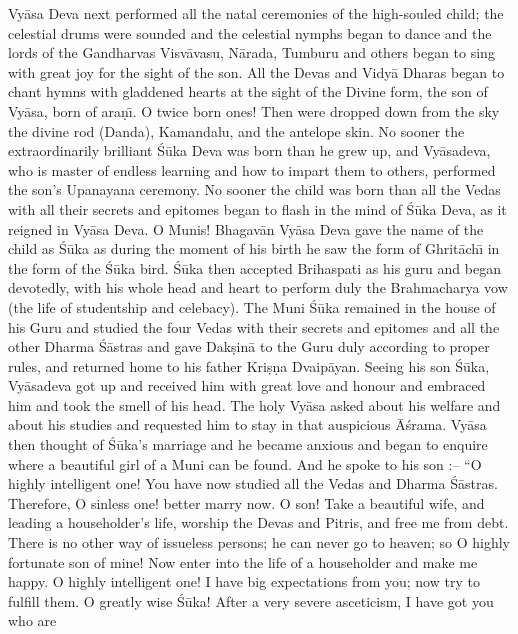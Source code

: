 Vy\=asa Deva next performed all the natal ceremonies of the high-souled child; the celestial drums were sounded and the celestial nymphs began to dance and the lords of the Gandharvas Visv\=avasu, N\=arada, Tumburu and others began to sing with great joy for the sight of the son. All the Devas and Vidy\=a Dharas began to chant hymns with gladdened hearts at the sight of the Divine form, the son of Vy\=asa, born of ara\d{n}\={\i}. O twice born ones! Then were dropped down from the sky the divine rod (Danda), Kamandalu, and the antelope skin. No sooner the extraordinarily brilliant \'S\=uka Deva was born than he grew up, and Vy\=asadeva, who is master of endless learning and how to impart them to others, performed the son's Upanayana ceremony. No sooner the child was born than all the Vedas with all their secrets and epitomes began to flash in the mind of \'S\=uka Deva, as it reigned in Vy\=asa Deva. O Munis! Bhagav\=an Vy\=asa Deva gave the name of the child as \'S\=uka as during the moment of his birth he saw the form of Ghrit\=ach\={\i} in the form of the \'S\=uka bird. \'S\=uka then accepted Brihaspati as his guru and began devotedly, with his whole head and heart to perform duly the Brahmacharya vow (the life of studentship and celebacy). The Muni \'S\=uka remained in the house of his Guru and studied the four Vedas with their secrets and epitomes and all the other Dharma \'S\=astras and gave Dak\d{s}in\=a to the Guru duly according to proper rules, and returned home to his father Kri\d{s}\d{n}a Dvaip\=ayan. Seeing his son \'S\=uka, Vy\=asadeva got up and received him with great love and honour and embraced him and took the smell of his head. The holy Vy\=asa asked about his welfare and about his studies and requested him to stay in that auspicious \=A\'srama. Vy\=asa then thought of \'S\=uka's marriage and he became anxious and began to enquire where a beautiful girl of a Muni can be found. And he spoke to his son :-- ``O highly intelligent one! You have now studied all the Vedas and Dharma \'S\=astras. Therefore, O sinless one! better marry now. O son! Take a beautiful wife, and leading a householder's life, worship the Devas and Pitris, and free me from debt. There is no other way of issueless persons; he can never go to heaven; so O highly fortunate son of mine! Now enter into the life of a householder and make me happy. O highly intelligent one! I have big expectations from you; now try to fulfill them. O greatly wise \'S\=uka! After a very severe asceticism, I have got you who are

